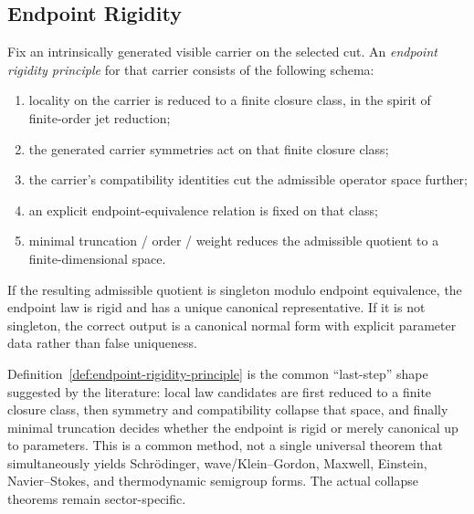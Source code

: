 \subsection{Endpoint Rigidity}

\begin{definition}
\label{def:endpoint-rigidity-principle}
Fix an intrinsically generated visible carrier on the selected cut. An
\emph{endpoint rigidity principle} for that carrier consists of the following
schema:
\begin{enumerate}[label=(\roman*), leftmargin=2em, itemsep=0.2em]
\item locality on the carrier is reduced to a finite closure class, in the
      spirit of finite-order jet reduction;
\item the generated carrier symmetries act on that finite closure class;
\item the carrier's compatibility identities cut the admissible operator space
      further;
\item an explicit endpoint-equivalence relation is fixed on that class;
\item minimal truncation / order / weight reduces the admissible quotient to a
      finite-dimensional space.
\end{enumerate}
If the resulting admissible quotient is singleton modulo endpoint
equivalence, the endpoint law is rigid and has a unique canonical
representative. If it is not singleton, the correct output is a
canonical normal form with explicit parameter data rather than false
uniqueness.
\end{definition}

\begin{remark}
\label{rem:endpoint-rigidity-schema}
Definition~\ref{def:endpoint-rigidity-principle} is the common
``last-step'' shape suggested by the literature: local law candidates are
first reduced to a finite closure class, then symmetry and compatibility
collapse that space, and finally minimal truncation decides whether the
endpoint is rigid or merely canonical up to parameters. This is a common
method, not a single universal theorem that simultaneously yields
Schr\"odinger, wave/Klein--Gordon, Maxwell, Einstein, Navier--Stokes, and
thermodynamic semigroup forms. The actual collapse theorems remain
sector-specific.
\end{remark}


